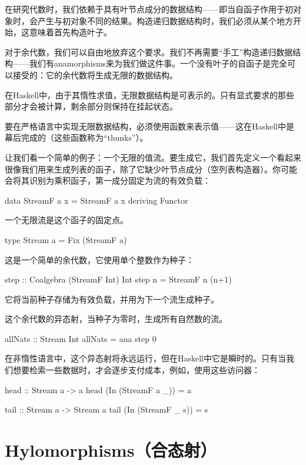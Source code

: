 \documentclass[DaoFP]{subfiles}
\begin{document}
    在研究代数时，我们依赖于具有叶节点成分的数据结构——即当自函子作用于初对象时，会产生与初对象不同的结果。构造递归数据结构时，我们必须从某个地方开始，这意味着首先构造叶子。

    对于余代数，我们可以自由地放弃这个要求。我们不再需要“手工”构造递归数据结构——我们有anamorphisms来为我们做这件事。一个没有叶子的自函子是完全可以接受的：它的余代数将生成无限的数据结构。

    在Haskell中，由于其惰性求值，无限数据结构是可表示的。只有显式要求的那些部分才会被计算，剩余部分则保持在挂起状态。

    要在严格语言中实现无限数据结构，必须使用函数来表示值——这在Haskell中是幕后完成的（这些函数称为“thunks”）。

    让我们看一个简单的例子：一个无限的值流。要生成它，我们首先定义一个看起来很像我们用来生成列表的函子，除了它缺少叶节点成分（空列表构造器）。你可能会将其识别为乘积函子，第一成分固定为流的有效负载：
    \begin{haskell}
        data StreamF a x = StreamF a x
        deriving Functor
    \end{haskell}
    一个无限流是这个函子的固定点。
    \begin{haskell}
        type Stream a = Fix (StreamF a)
    \end{haskell}
    这是一个简单的余代数，它使用单个整数作为种子：
    \begin{haskell}
        step :: Coalgebra (StreamF Int) Int
        step n = StreamF n (n+1)
    \end{haskell}
    它将当前种子存储为有效负载，并用为下一个流生成种子。

    这个余代数的异态射，当种子为零时，生成所有自然数的流。
    \begin{haskell}
        allNats :: Stream Int
        allNats = ana step 0
    \end{haskell}
    在非惰性语言中，这个异态射将永远运行，但在Haskell中它是瞬时的。只有当我们想要检索一些数据时，才会逐步支付成本，例如，使用这些访问器：
    \begin{haskell}
        head :: Stream a -> a
        head (In (StreamF a _)) = a

        tail :: Stream a -> Stream a
        tail (In (StreamF _ s)) = s
    \end{haskell}


    \section{Hylomorphisms（合态射）}
\end{document}
